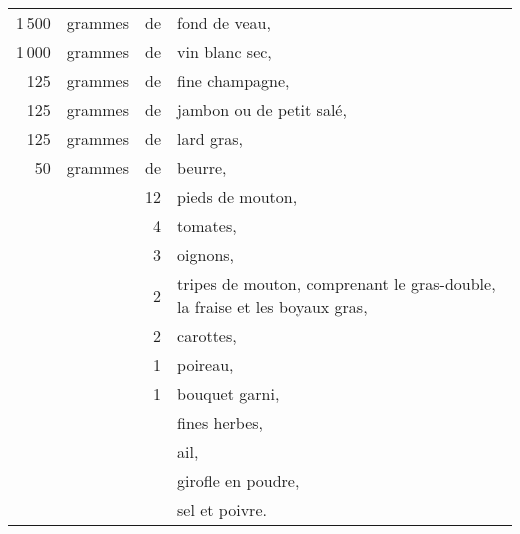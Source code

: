 \footnotesize
\begin{longtable}{rrrp{18em}}
  1 500 & grammes & de & fond de veau,                                                                    \\
  1 000 & grammes & de & vin blanc sec,                                                                   \\
    125 & grammes & de & fine champagne,                                                                  \\
    125 & grammes & de & jambon ou de petit salé,                                                         \\
    125 & grammes & de & lard gras,                                                                       \\
     50 & grammes & de & beurre,                                                                          \\
        &         & 12 & pieds de mouton,                                                                 \\
        &         &  4 & tomates,                                                                         \\
        &         &  3 & oignons,                                                                         \\
        &         &  2 & tripes de mouton, comprenant le gras-double, la fraise et les boyaux gras,       \\
        &         &  2 & carottes,                                                                        \\
        &         &  1 & poireau,                                                                         \\
        &         &  1 & bouquet garni,                                                                   \\
        &         &    & fines herbes,                                                                    \\
        &         &    & ail,                                                                             \\
        &         &    & girofle en poudre,                                                               \\
        &         &    & sel et poivre.                                                                   \\
\end{longtable}
\normalsize

